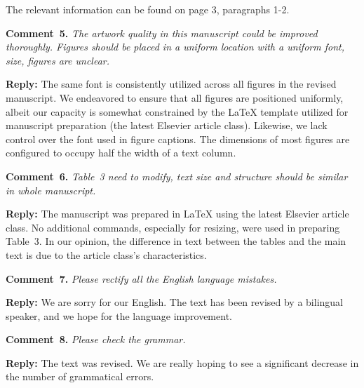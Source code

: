 \documentclass[a4paper,fleqn]{cas-sc}
\begin{document}
The relevant information can be found on page 3, paragraphs 1-2.


\vspace{1cm}
\noindent
\textcolor[rgb]{0.00,0.50,1.00}{\textbf{Comment~5.}}
\emph{The artwork quality in this manuscript could be improved thoroughly.
Figures should be placed in a uniform location with a uniform font, size, figures are unclear.}

\noindent
\textcolor[rgb]{0.51,0.00,0.00}{\textbf{Reply:}}
The same font is consistently utilized across all figures in the revised manuscript. 
We endeavored to ensure that all figures are positioned uniformly, 
albeit our capacity is somewhat constrained 
by the LaTeX template utilized for manuscript preparation
(the latest Elsevier article class). 
Likewise, we lack control over the font used in figure captions. 
The dimensions of most figures are configured to occupy half the width of a text column.


\vspace{1cm}
\noindent
\textcolor[rgb]{0.00,0.50,1.00}{\textbf{Comment~6.}}
\emph{Table~3 need to modify, text size and structure should be similar in whole manuscript.}

\noindent
\textcolor[rgb]{0.51,0.00,0.00}{\textbf{Reply:}}
The manuscript was prepared in LaTeX using the latest Elsevier article class.
No additional commands, especially for resizing, were used in preparing Table~3. 
In our opinion, the difference in text between the tables and the main text is due to the article class's characteristics.

%


\vspace{1cm}
\noindent
\textcolor[rgb]{0.00,0.50,1.00}{\textbf{Comment~7.}}
\emph{Please rectify all the English language mistakes.}

\noindent
\textcolor[rgb]{0.51,0.00,0.00}{\textbf{Reply:}}
We are sorry for our English.
The text has been revised by a bilingual speaker, and we hope for the language improvement.


\vspace{1cm}
\noindent
\textcolor[rgb]{0.00,0.50,1.00}{\textbf{Comment~8.}}
\emph{Please check the grammar.}

\noindent
\textcolor[rgb]{0.51,0.00,0.00}{\textbf{Reply:}}
The text was revised.
We are really hoping to see a significant decrease in the number of grammatical errors.
\end{document}
